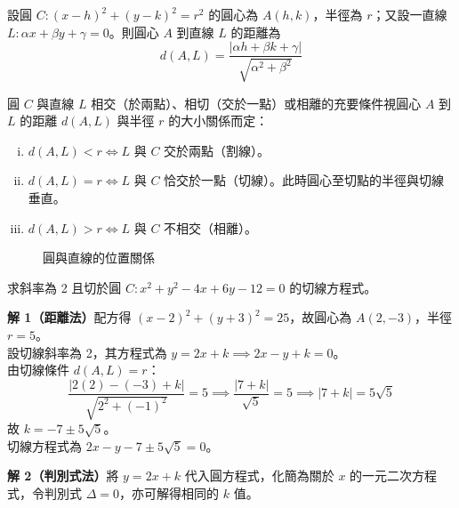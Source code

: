 設圓 $C : (x-h)^2 + (y-k)^2 = r^2$ 的圓心為 $A(h,k)$，半徑為 $r$；又設一直線 $L : \alpha x + \beta y + \gamma = 0$。則圓心 $A$ 到直線 $L$ 的距離為
\begin{equation}
d(A, L) = \frac{|\alpha h + \beta k + \gamma|}{\sqrt{\alpha^2 + \beta^2}} \label{eq:b4s-3-5-dist}
\end{equation}

\begin{proposition}
圓 $C$ 與直線 $L$ 相交（於兩點）、相切（交於一點）或相離的充要條件視圓心 $A$ 到 $L$ 的距離 $d(A,L)$ 與半徑 $r$ 的大小關係而定：
\begin{enumerate}[(i)]
  \item $d(A, L) < r \iff L$ 與 $C$ 交於兩點（割線）。
  \item $d(A, L) = r \iff L$ 與 $C$ 恰交於一點（切線）。此時圓心至切點的半徑與切線垂直。
  \item $d(A, L) > r \iff L$ 與 $C$ 不相交（相離）。
\end{enumerate}
\end{proposition}

\begin{figure}[htbp]
\centering
{}
\caption{圓與直線的位置關係}
\label{fig:b4s-3-35}
\end{figure}

\begin{example}
求斜率為 2 且切於圓 $C : x^2 + y^2 - 4x + 6y - 12 = 0$ 的切線方程式。

\textbf{解 1（距離法）}\quad 配方得 $(x-2)^2 + (y+3)^2 = 25$，故圓心為 $A(2,-3)$，半徑 $r = 5$。\\
設切線斜率為 2，其方程式為 $y = 2x + k \implies 2x - y + k = 0$。\\
由切線條件 $d(A, L) = r$：
\[ \frac{|2(2) - (-3) + k|}{\sqrt{2^2 + (-1)^2}} = 5 \implies \frac{|7 + k|}{\sqrt{5}} = 5 \implies |7 + k| = 5\sqrt{5} \]
故 $k = -7 \pm 5\sqrt{5}$。\\
切線方程式為 $2x - y - 7 \pm 5\sqrt{5} = 0$。

\textbf{解 2（判別式法）}\quad 將 $y = 2x + k$ 代入圓方程式，化簡為關於 $x$ 的一元二次方程式，令判別式 $\Delta = 0$，亦可解得相同的 $k$ 值。
\end{example}

